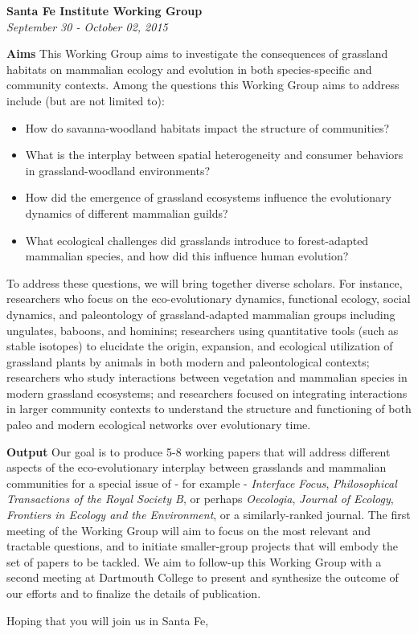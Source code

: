 \documentclass[sfi,11pt,foldmarks=off,backaddress=false,letterpaper]{scrlttr2}
\begin{document}
\begin{letter}{{\bfseries Santa Fe Institute Working Group}\\ {\itshape September 30 - October 02, 2015} }
\vspace{10pt}

{\bfseries Aims} This Working Group aims to investigate the consequences of grassland habitats on mammalian ecology and evolution in both species-specific and community contexts. Among the questions this Working Group aims to address include (but are not limited to):
\begin{itemize}
\item How do savanna-woodland habitats impact the structure of communities?
\item What is the interplay between spatial heterogeneity and consumer behaviors in grassland-woodland environments?
\item How did the emergence of grassland ecosystems influence the evolutionary dynamics of different mammalian guilds?
\item What ecological challenges did grasslands introduce to forest-adapted mammalian species, and how did this influence human evolution?
\end{itemize}





To address these questions, we will bring together diverse scholars. For instance, researchers who focus on the eco-evolutionary dynamics, functional ecology, social dynamics, and paleontology of grassland-adapted mammalian groups including ungulates, baboons, and hominins; researchers using quantitative tools (such as stable isotopes) to elucidate the origin, expansion, and ecological utilization of grassland plants by animals in both modern and paleontological contexts; researchers who study interactions between vegetation and mammalian species in modern grassland ecosystems; and researchers focused on integrating  interactions in larger community contexts to understand the structure and functioning of both paleo and modern ecological networks over evolutionary time.

\vspace{10pt}

{\bfseries Output} Our goal is to produce 5-8 working papers that will address different aspects of the eco-evolutionary interplay between grasslands and mammalian communities for a special issue of - for example - {\itshape Interface Focus}, {\itshape Philosophical Transactions of the Royal Society B}, or perhaps {\itshape Oecologia}, {\itshape Journal of Ecology}, {\itshape Frontiers in Ecology and the Environment}, or a similarly-ranked journal. The first meeting of the Working Group will aim to focus on the most relevant and tractable questions, and to initiate smaller-group projects that will embody the set of papers to be tackled. We aim to follow-up this Working Group with a second meeting at Dartmouth College to present and synthesize the outcome of our efforts and to finalize the details of publication.



\closing{Hoping that you will join us in Santa Fe,}


\end{letter}
\end{document}
